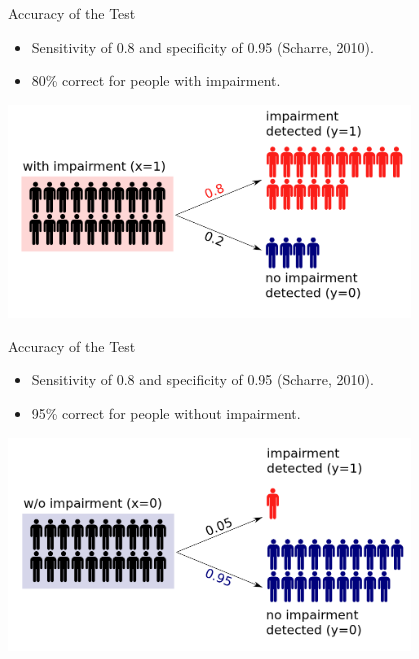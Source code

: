 \documentclass{beamer}
\begin{document}
\begin{frame}{Accuracy of the Test}
\begin{itemize}
  \item Sensitivity of 0.8 and specificity of 0.95 (Scharre, 2010).
  \item 80\% correct for people with impairment.
\end{itemize}
\begin{center}
  \includegraphics[width=0.8\textwidth]{with_impairment.png}
\end{center}
\end{frame}

\begin{frame}{Accuracy of the Test}
\begin{itemize}
  \item Sensitivity of 0.8 and specificity of 0.95 (Scharre, 2010).
  \item 95\% correct for people without impairment.
\end{itemize}
\begin{center}
  \includegraphics[width=0.8\textwidth]{without_impairment.png}
\end{center}
\end{frame}
\end{document}
